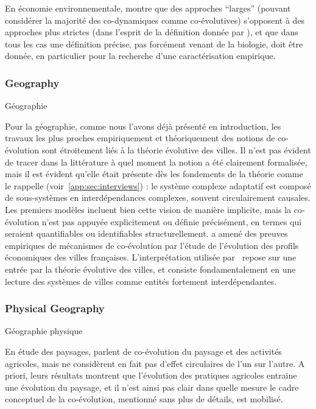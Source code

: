 En économie environnementale, \cite{kallis2007coevolution} montre que des approches ``larges'' (pouvant considérer la majorité des co-dynamiques comme co-évolutives) s'opposent à des approches plus strictes (dans l'esprit de la définition donnée par \cite{schamp201020}), et que dans tous les cas une définition précise, pas forcément venant de la biologie, doit être donnée, en particulier pour la recherche d'une caractérisation empirique.




\subsubsection{Geography}{Géographie}

Pour la géographie, comme nous l'avons déjà présenté en introduction, les travaux les plus proches empiriquement et théoriquement des notions de co-évolution sont étroitement liés à la théorie évolutive des villes. Il n'est pas évident de tracer dans la littérature à quel moment la notion a été clairement formalisée, mais il est évident qu'elle était présente dès les fondements de la théorie comme le rappelle  (voir~\ref{app:sec:interviews}) : le système complexe adaptatif est composé de sous-systèmes en interdépendances complexes, souvent circulairement causales. Les premiers modèles incluent bien cette vision de manière implicite, mais la co-évolution n'est pas appuyée explicitement ou définie précisément, en termes qui seraient quantifiables ou identifiables structurellement. \cite{paulus2004coevolution} a amené des preuves empiriques de mécanismes de co-évolution par l'étude de l'évolution des profils économiques des villes françaises. L'interprétation utilisée par~\cite{schmitt2014modelisation} repose sur une entrée par la théorie évolutive des villes, et consiste fondamentalement en une lecture des systèmes de villes comme entités fortement interdépendantes.


\subsubsection{Physical Geography}{Géographie physique}

En étude des paysages, \cite{sheeren2015coevolution} parlent de co-évolution du paysage et des activités agricoles, mais ne considèrent en fait pas d'effet circulaires de l'un sur l'autre. A priori, leurs résultats montrent que l'évolution des pratiques agricoles entraine une évolution du paysage, et il n'est ainsi pas clair dans quelle mesure le cadre conceptuel de la co-évolution, mentionné sans plus de détails, est mobilisé.


